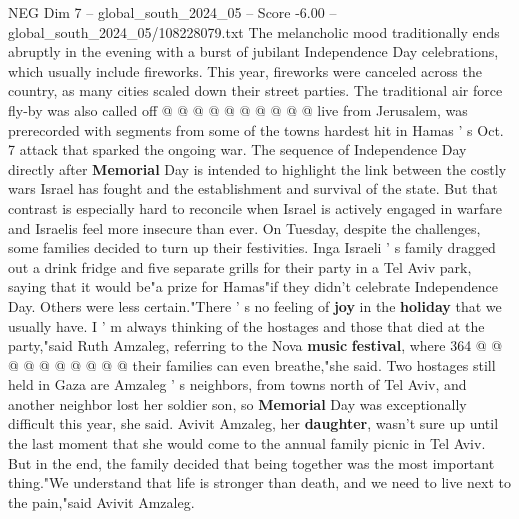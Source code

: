 \begin{textsample}{NEG Dim 7 – global\_south\_2024\_05 – Score -6.00 – global\_south\_2024\_05/108228079.txt}
The melancholic mood traditionally ends abruptly in the evening with a burst of jubilant Independence Day celebrations, which usually include fireworks.
This year, fireworks were canceled across the country, as many cities scaled down their street parties.
The traditional air force fly-by was also called off @ @ @ @ @ @ @ @ @ @ live from Jerusalem, was prerecorded with segments from some of the towns hardest hit in Hamas ' s Oct. 7 attack that sparked the ongoing war.
The sequence of Independence Day directly after \textbf{Memorial} Day is intended to highlight the link between the costly wars Israel has fought and the establishment and survival of the state.
But that contrast is especially hard to reconcile when Israel is actively engaged in warfare and Israelis feel more insecure than ever.
On Tuesday, despite the challenges, some families decided to turn up their festivities.
Inga Israeli ' s family dragged out a drink fridge and five separate grills for their party in a Tel Aviv park, saying that it would be"a prize for Hamas"if they didn't celebrate Independence Day.
Others were less certain."There ' s no feeling of \textbf{joy} in the \textbf{holiday} that we usually have.
I ' m always thinking of the hostages and those that died at the party,"said Ruth Amzaleg, referring to the Nova \textbf{music} \textbf{festival}, where 364 @ @ @ @ @ @ @ @ @ @ their families can even breathe,"she said.
Two hostages still held in Gaza are Amzaleg ' s neighbors, from towns north of Tel Aviv, and another neighbor lost her soldier son, so \textbf{Memorial} Day was exceptionally difficult this year, she said.
Avivit Amzaleg, her \textbf{daughter}, wasn't sure up until the last moment that she would come to the annual family picnic in Tel Aviv.
But in the end, the family decided that being together was the most important thing."We understand that life is stronger than death, and we need to live next to the pain,"said Avivit Amzaleg.

\end{textsample}
